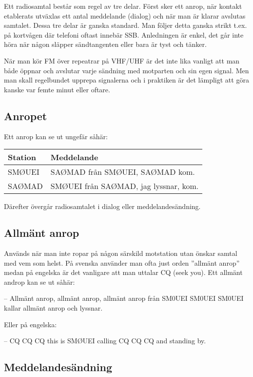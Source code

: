 Ett radiosamtal består som regel av tre delar. Först sker ett anrop, när kontakt
etablerats utväxlas ett antal meddelande (dialog) och när man är klarar avslutas
samtalet. Dessa tre delar är ganska standard. Man följer detta ganska strikt
t.ex. på kortvågen där telefoni oftast innebär SSB. Anledningen är enkel, det
går inte höra när någon släpper sändtangenten eller bara är tyst och tänker.

När man kör FM över repeatrar på VHF/UHF är det inte lika vanligt att man både
öppnar och avslutar varje sändning med motparten och sin egen signal. Men man
skall regelbundet upprepa signalerna och i praktiken är det lämpligt att göra
kanske var femte minut eller oftare.

\subsection{Anropet}

Ett anrop kan se ut ungefär såhär:

\begin{tabular}{ll}
	Station & Meddelande                            \\ \hline
	SMØUEI  & SAØMAD från SMØUEI, SAØMAD kom.       \\
	SAØMAD  & SMØUEI från SAØMAD, jag lyssnar, kom.
\end{tabular}

Därefter övergår radiosamtalet i dialog eller meddelandesändning.

\subsection{Allmänt anrop}

Används när man inte ropar på någon särskild motstation utan önskar samtal med
vem som helst. På svenska använder man ofta just orden ''allmänt anrop'' medan
på engelska är det vanligare att man uttalar CQ (seek you). Ett allmänt androp
kan se ut såhär:

-- Allmänt anrop, allmänt anrop, allmänt anrop från SM0UEI SM0UEI SM0UEI kallar
allmänt anrop och lyssnar.

Eller på engelska:

-- CQ CQ CQ this is SMØUEI calling CQ CQ CQ and standing by.

\subsection{Meddelandesändning}

